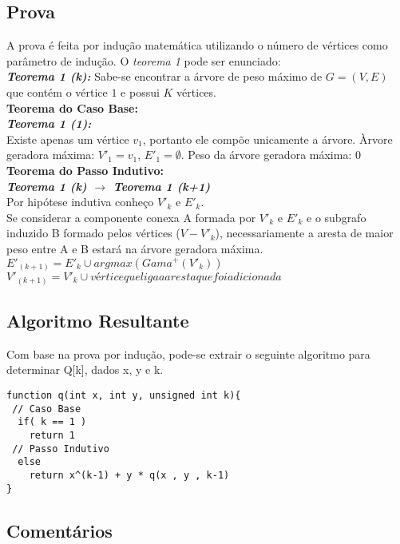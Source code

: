 \documentclass[twoside]{article}
\begin{document}
\begin{multicols}{2}
\subsection{ Prova }
\indent A prova é feita por indução matemática utilizando o número de vértices como parâmetro de indução. O \textit{teorema 1} pode ser enunciado:\\

\textit{\textbf{Teorema 1 (k):}} Sabe-se encontrar a árvore de peso máximo de $G=(V,E)$ que contém o vértice $1$ e possui $K$ vértices.\\

\textbf{Teorema do Caso Base:}\\

\textit{\textbf{Teorema 1 (1):}}\\
Existe apenas um vértice $v_1$, portanto ele compõe unicamente a árvore.
Àrvore geradora máxima: $V'_1 = {v_1}$, $E'_1 = \emptyset$.
Peso da árvore geradora máxima: 0\\

\textbf{Teorema do Passo Indutivo:}\\

\textit{\textbf{Teorema 1 (k) $\rightarrow$ Teorema 1 (k+1)}}\\
Por hipótese indutiva conheço $V'_k$ e $E'_k$.\\
Se considerar a componente conexa A formada por $V'_k$ e $E'_k$ e o subgrafo induzido B formado pelos
vértices ($V - V'_k$), necessariamente a aresta de maior peso entre A e B estará na árvore
geradora máxima.\\

$E'_(k+1) = E'_k \cup {argmax(Gama^+(V'_k))}$\\
$V'_(k+1) = V'_k \cup {vértice que liga a aresta que foi adicionada}$\\

\subsection{ Algoritmo Resultante }
\indent Com base na prova por indução, pode-se extrair o seguinte algoritmo para determinar Q[k], dados x, y e k.

\begin{lstlisting}
function q(int x, int y, unsigned int k){
 // Caso Base
  if( k == 1 )
    return 1
 // Passo Indutivo
  else
    return x^(k-1) + y * q(x , y , k-1)  
}
\end{lstlisting}

\subsection{ Comentários }


\end{multicols}
\end{document}
